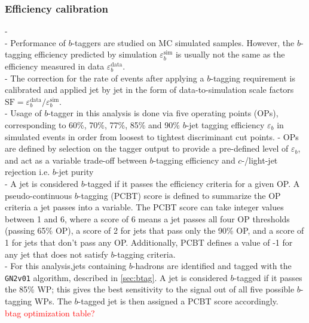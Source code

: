 \documentclass[../thesis.tex]{subfiles}
\begin{document}
\subsubsection*{Efficiency calibration}
- \citep{ftag:calib}\\
- Performance of $b$-taggers are studied on MC simulated samples. However, the $b$-tagging efficiency predicted by simulation $\varepsilon_b^\mathrm{sim}$ is usually not the same as the efficiency measured in data $\varepsilon_b^\mathrm{data}$.\\
- The correction for the rate of events after applying a $b$-tagging requirement is calibrated and applied jet by jet in the form of data-to-simulation scale factors $\mathrm{SF}=\varepsilon_b^\mathrm{data}/\varepsilon_b^\mathrm{sim}$.\\
- Usage of $b$-tagger in this analysis is done via five operating points (OPs), corresponding to 60\%, 70\%, 77\%, 85\% and 90\% $b$-jet tagging efficiency $\varepsilon_b$ in simulated \ttbar events in order from loosest to tightest discriminant cut points.
- OPs are defined by selection on the tagger output to provide a pre-defined level of $\varepsilon_b$, and act as a variable trade-off between $b$-tagging efficiency and $c$-/light-jet rejection i.e. $b$-jet purity \\
- A jet is considered $b$-tagged if it passes the efficiency criteria for a given OP. A pseudo-continuous $b$-tagging (PCBT) score is defined to summarize the OP criteria a jet passes into a variable. The PCBT score can take integer values between 1 and 6, where a score of 6 means a jet passes all four OP thresholds (passing 65\% OP), a score of 2 for jets that pass only the 90\% OP, and a score of 1 for jets that don't pass any OP. Additionally, PCBT defines a value of -1 for any jet that does not satisfy $b$-tagging criteria.\\

- For this analysis,jets containing $b$-hadrons are identified and tagged with the \verb|GN2v01| algorithm, described in \autoref{sec:btag}. A jet is considered $b$-tagged if it passes the 85\% WP; this gives the best sensitivity to the signal out of all five possible $b$-tagging WPs. The $b$-tagged jet is then assigned a PCBT score accordingly.\\
\textcolor{red}{btag optimization table?}
\end{document}
